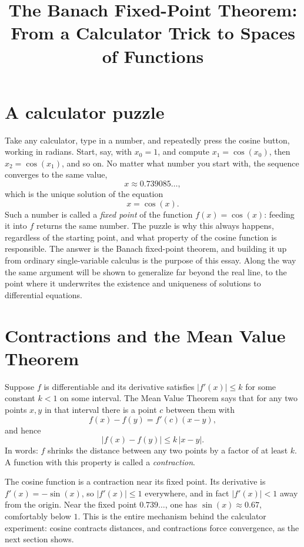 \documentclass{essay}
\title{The Banach Fixed-Point Theorem:\\
From a Calculator Trick to Spaces of Functions}
\author{}
\date{}
\begin{document}
\maketitle

\section{A calculator puzzle}

Take any calculator, type in a number, and repeatedly press the cosine
button, working in radians. Start, say, with \(x_{0} = 1\), and compute
\(x_{1} = \cos(x_{0})\), then \(x_{2} = \cos(x_{1})\), and so on. No matter what
number you start with, the sequence converges to the same value,
\[ x \approx 0.739085\ldots, \]
which is the unique solution of the equation
\[ x = \cos(x). \]
Such a number is called a \emph{fixed point} of the function
\(f(x) = \cos(x)\): feeding it into \(f\) returns the same number. The
puzzle is why this always happens, regardless of the starting point,
and what property of the cosine function is responsible. The answer
is the Banach fixed-point theorem, and building it up from ordinary
single-variable calculus is the purpose of this essay. Along the way
the same argument will be shown to generalize far beyond the real
line, to the point where it underwrites the existence and uniqueness
of solutions to differential equations.

\section{Contractions and the Mean Value Theorem}

Suppose \(f\) is differentiable and its derivative satisfies
\(|f'(x)| \le k\) for some constant \(k < 1\) on some interval. The Mean
Value Theorem says that for any two points \(x, y\) in that interval
there is a point \(c\) between them with
\[ f(x) - f(y) = f'(c)(x - y), \]
and hence
\[ |f(x) - f(y)| \le k\,|x - y|. \]
In words: \(f\) shrinks the distance between any two points by a factor
of at least \(k\). A function with this property is called a
\emph{contraction}.

The cosine function is a contraction near its fixed point. Its
derivative is \(f'(x) = -\sin(x)\), so \(|f'(x)| \le 1\) everywhere, and
in fact \(|f'(x)| < 1\) away from the origin. Near the fixed point
\(0.739\ldots\), one has \(\sin(x) \approx 0.67\), comfortably below \(1\).
This is the entire mechanism behind the calculator experiment:
cosine contracts distances, and contractions force convergence, as
the next section shows.
\end{document}
